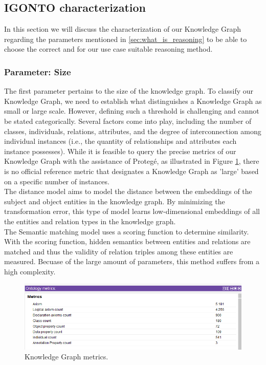 \documentclass[
  a4paper,  %
  twoside,  %
  bibliography=totoc,
  headsepline,
  cleardoublepage=empty,
  parskip=half,
  draft=false
]{scrbook}
\begin{document}
\subsection{IGONTO characterization}\label{sec:igonto_characterization}
In this section we will discuss the characterization of our Knowledge Graph regarding the parameters mentioned in \ref{sec:what_is_reasoning} to be able to choose the correct and for our use case suitable reasoning method.\\

\subsubsection{Parameter: Size}

The first parameter pertains to the size of the knowledge graph. To classify our Knowledge Graph, we need to establish what distinguishes a Knowledge Graph as small or large scale. However, defining such a threshold is challenging and cannot be stated categorically. Several factors come into play, including the number of classes, individuals, relations, attributes, and the degree of interconnection among individual instances (i.e., the quantity of relationships and attributes each instance possesses). While it is feasible to query the precise metrics of our Knowledge Graph with the assistance of Protegé, as illustrated in Figure \ref{fig:ProtegeMetrics}, there is no official reference metric that designates a Knowledge Graph as 'large' based on a specific number of instances. \\
The distance model aims to model the distance between the embeddings of the subject and object entities in the knowledge graph. By minimizing the transformation error, this type of model learns low-dimensional embeddings of all the entities and relation types in the knowledge graph.\\
The Semantic matching model uses a scoring function to determine similarity. With the scoring function, hidden semantics between entities and relations are matched and thus the validity of relation triples among these entities are measured. Becuase of the large amount of parameters, this method suffers from a high complexity. 

\begin{figure}
  \centering
  \includegraphics[width=\textwidth]{graphics/ProtegeMetrics.PNG}
  \caption{Knowledge Graph metrics. }
  \label{fig:ProtegeMetrics}
\end{figure}
\end{document}
